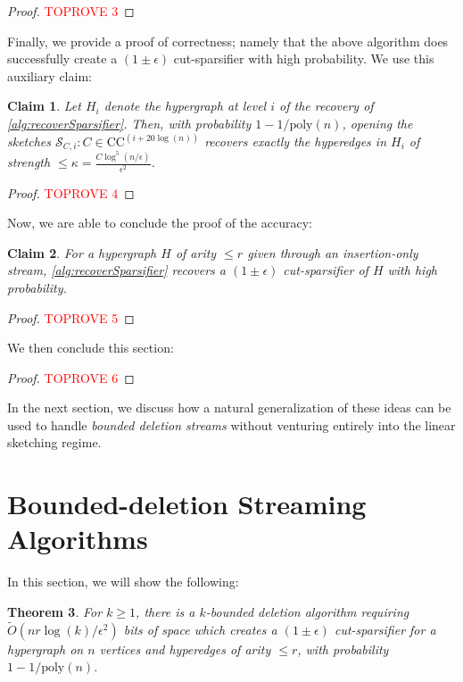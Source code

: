 \documentclass[11pt]{article}
\newtheorem{theorem}{Theorem}[section]
\newtheorem{claim}[theorem]{Claim}
\theoremstyle{definition}
\newcommand{\eps}{\epsilon}
\begin{document}
\begin{proof}\textcolor{red}{TOPROVE 3}\end{proof}

Finally, we provide a proof of correctness; namely that the above algorithm does successfully create a $(1 \pm \eps)$ cut-sparsifier with high probability. We use this auxiliary claim:

\begin{claim}\label{clm:recoversLowStrength}
	Let $H_i$ denote the hypergraph at level $i$ of the recovery of \cref{alg:recoverSparsifier}. Then, with probability $1 - 1 / \mathrm{poly}(n)$, opening the sketches $\mathcal{S}_{C, i}: C \in \mathrm{CC}^{(i + 20 \log(n))}$ recovers exactly the hyperedges in $H_i$ of strength $\leq \kappa =  \frac{C \log^5(n / \eps)}{ \eps^2}$.
	\end{claim}

\begin{proof}\textcolor{red}{TOPROVE 4}\end{proof}

Now, we are able to conclude the proof of the accuracy:

\begin{claim}\label{clm:accuracyInsertion}
	For a hypergraph $H$ of arity $\leq r$ given through an insertion-only stream, \cref{alg:recoverSparsifier} recovers a $(1 \pm \eps)$ cut-sparsifier of $H$ with high probability. 
\end{claim}

\begin{proof}\textcolor{red}{TOPROVE 5}\end{proof}

We then conclude this section:

\begin{proof}\textcolor{red}{TOPROVE 6}\end{proof}

In the next section, we discuss how a natural generalization of these ideas can be used to handle \emph{bounded deletion streams} without venturing entirely into the linear sketching regime.

\section{Bounded-deletion Streaming Algorithms}\label{sec:booundedDeletion}

In this section, we will show the following:

\begin{theorem}\label{thm:boundedDeletion}
	For $k \geq 1$, there is a $k$-bounded deletion algorithm requiring $\widetilde{O}(n r \log(k) / \eps^2)$ bits of space which creates a $(1 \pm \eps)$ cut-sparsifier for a hypergraph on $n$ vertices and hyperedges of arity $\leq r$, with probability $1 - 1 / \mathrm{poly}(n)$.
\end{theorem}
\end{document}
